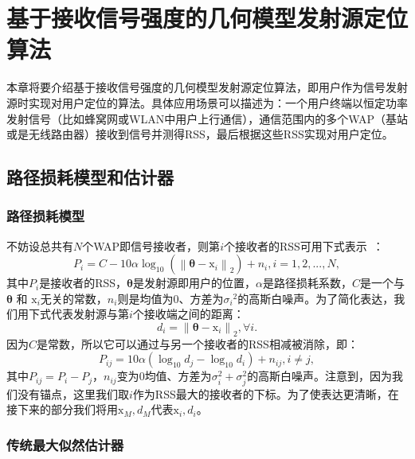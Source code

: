 \chapter{基于接收信号强度的几何模型发射源定位算法}
\label{cha:transmitter}

本章将要介绍基于接收信号强度的几何模型发射源定位算法，即用户作为信号发射源时实现对用户定位的算法。具体应用场景可以描述为：一个用户终端以恒定功率发射信号（比如蜂窝网或WLAN中用户上行通信），通信范围内的多个WAP（基站或是无线路由器）接收到信号并测得RSS，最后根据这些RSS实现对用户定位。

\section{路径损耗模型和估计器}

\subsection{路径损耗模型}

不妨设总共有$N$个WAP即信号接收者，则第$i$个接收者的RSS可用下式表示~\cite{erceg1999empirically}：
\begin{equation}
{P_i} = C - 10\alpha {\log _{10}}({\left\| {{\bm{\theta}} - {{\bm{\mathrm{x}}_i}}} \right\|_2}) + {n_i}, i = 1,2,...,N,\label{eq:rss}
\end{equation}
其中$P_i$是接收者的RSS，$\bm{\theta}$是发射源即用户的位置，$\alpha$是路径损耗系数，$C$是一个与$\bm{\theta}$ 和 $\bm{\mathrm{x}}_i$无关的常数，$n_i$则是均值为$0$、方差为${\sigma_i}^2$的高斯白噪声。为了简化表达，我们用下式代表发射源与第$i$个接收端之间的距离：
\begin{equation}
d_i = {\left\| {{\bm{\theta}} - {{\bm{\mathrm{x}}_i}}} \right\|_2}, \forall i. \label{eq:d}
\end{equation}
因为$C$是常数，所以它可以通过与另一个接收者的RSS相减被消除，即：
\begin{equation}
{P_{ij}} = 10\alpha ({\log _{10}}d_j - {\log _{10}}d_i) + {n_{ij}}, i \neq j, \label{eq:diff_rss}
\end{equation}
其中$P_{ij} = P_i - P_j$，$n_{ij}$变为$0$均值、方差为$\sigma_i^2 + \sigma_j^2$的高斯白噪声。注意到，因为我们没有锚点，这里我们取$i$作为RSS最大的接收者的下标。为了使表达更清晰，在接下来的部分我们将用$\bm{\mathrm{x}}_M, d_M$代表$\bm{\mathrm{x}}_i, d_i$。

\subsection{传统最大似然估计器}

